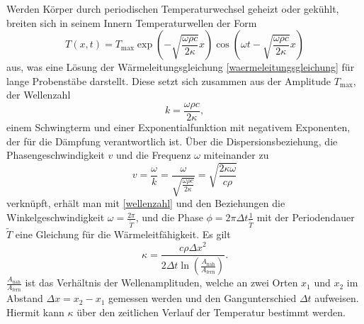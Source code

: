 Werden Körper durch periodischen Temperaturwechsel geheizt oder gekühlt, breiten sich in seinem Innern Temperaturwellen der Form
\begin{equation}
	\label{temperaturwelle}
	T(x,t)= T_\mathup{max} \exp{\left(-\sqrt{\frac{\omega \rho c}{2\kappa}}x\right)} \cos{\left(\omega t - \sqrt{\frac{\omega \rho c}{2\kappa}}x\right)}
\end{equation}
aus, was eine Lösung der Wärmeleitungsgleichung \eqref{waermeleitungsgleichung} für lange Probenstäbe darstellt. 
Diese setzt sich zusammen aus der Amplitude $T_\text{max}$, der Wellenzahl
\begin{equation}
	\label{wellenzahl}
	k=\frac{\omega \rho c}{2\kappa},
\end{equation}
einem Schwingterm und einer Exponentialfunktion mit negativem Exponenten, der für die Dämpfung verantwortlich ist.
Über die Dispersionsbeziehung, die Phasengeschwindigkeit $v$ und die Frequenz $\omega$ miteinander zu
\begin{equation}
	\label{dispersion}
	v=\frac{\omega}{k}=\frac{\omega}{\sqrt{\frac{\omega\rho c}{2\kappa}}}=\sqrt{\frac{2\kappa\omega}{c\rho}}
\end{equation}
verknüpft, erhält man mit \eqref{wellenzahl} und den Beziehungen die Winkelgeschwindigkeit $\omega=\frac{2\pi}{\tilde{T}}$, und die Phase $\phi=2\pi\Delta{t}\frac{1}{\tilde{T}}$ mit der Periodendauer $\tilde{T}$ eine Gleichung für die Wärmeleitfähigkeit.
Es gilt
\begin{equation}
	\label{waermeleitfaehigkeit}
	\kappa=\frac{c\rho{\Delta{x}}^2}{2\Delta{t}\ln\left({\frac{A_\text{nah}}{A_\text{fern}}}\right)}.
\end{equation}
$\frac{A_\text{nah}}{A_\text{fern}}$ ist das Verhältnis der Wellenamplituden, welche an zwei Orten $x_1$ und $x_2$ im Abstand
$\Delta{x}=x_2-x_1$ gemessen werden und den Gangunterschied $\Delta{t}$ aufweisen. 
Hiermit kann $\kappa$ über den zeitlichen Verlauf der Temperatur bestimmt werden.
